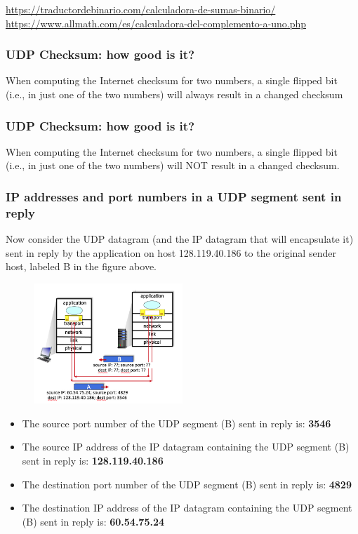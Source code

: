     \url*{https://traductordebinario.com/calculadora-de-sumas-binario/}
    \linebreak
    \url*{https://www.allmath.com/es/calculadora-del-complemento-a-uno.php}
        

    \subsubsection*{UDP Checksum: how good is it?}
    \noindent When computing the Internet checksum for two numbers, a single flipped bit (i.e., in just one of
    the two numbers) will always result in a changed checksum

    \subsubsection*{UDP Checksum: how good is it?}
    \noindent When computing the Internet checksum for two numbers, a single flipped bit (i.e., in just one of
    the two numbers) will NOT result in a changed checksum.

    \subsubsection*{IP addresses and port numbers in a UDP segment sent in reply}
    \noindent Now consider the UDP datagram (and the IP datagram that will encapsulate it) sent in reply by the
    application on host 128.119.40.186  to the original sender host, labeled B in the figure above.
    \begin{figure}[H]
        \centering
        \includegraphics[width=0.5\textwidth]{img/3.3.9.jpg}
        \label{fig:UDP}
    \end{figure}
    \begin{itemize}
        \item The source port number of the UDP segment (B) sent in reply is: \textbf{3546}
        \item The source IP address of the IP datagram containing the UDP segment (B) sent in reply is: \textbf{128.119.40.186}
        \item The destination port number of the UDP segment (B) sent in reply  is: \textbf{4829}
        \item The destination IP address of the IP datagram containing the UDP segment (B) sent in reply is: \textbf{60.54.75.24}
    \end{itemize}

